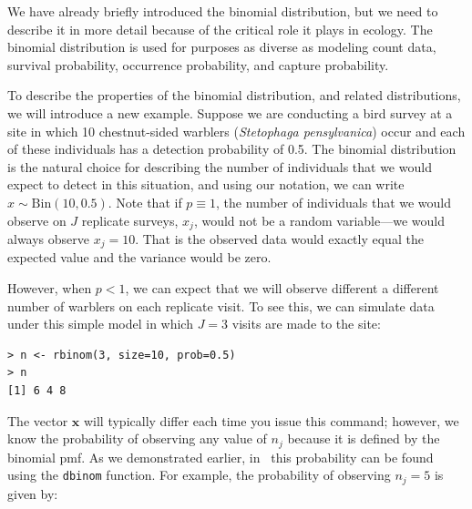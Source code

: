 We have already briefly introduced the binomial distribution, but we
need to describe it in more detail because of the critical role it
plays in ecology. The binomial distribution is
used for purposes as diverse as modeling count data, survival
probability, occurrence probability, and capture probability.

To describe the properties of the binomial distribution, and related
distributions, we will introduce a new example.
Suppose we are conducting a bird survey at a site in which 10
chestnut-sided warblers (\textit{Stetophaga pensylvanica}) occur and
each of these individuals has a detection probability of 0.5. The
binomial distribution is the natural choice for describing the number
of individuals that we would expect to detect in this
situation, and using our notation, we can write
$x \sim \text{Bin}(10, 0.5)$. Note that if $p \equiv 1$, the number of
individuals that we would observe on $J$ replicate surveys, $x_j$,
would not be a random variable---we would always observe
$x_j=10$. That is the observed data would exactly equal the expected
value and the variance would be zero.

However, when $p<1$, we can expect that we will observe different
a different number of warblers on each replicate visit. To see this,
we can simulate data under this simple model in which $J=3$ visits are
made to the site:
\begin{verbatim}
> n <- rbinom(3, size=10, prob=0.5)
> n
[1] 6 4 8
\end{verbatim}
The vector $\mathbf{x}$ will typically differ each time you issue this
command; however, we know the probability of observing any value of
$n_j$ because it is defined by the binomial pmf. As we demonstrated
earlier, in \R~this probability can be found using the \verb+dbinom+
function. For example, the probability of observing $n_j=5$ is given by:


